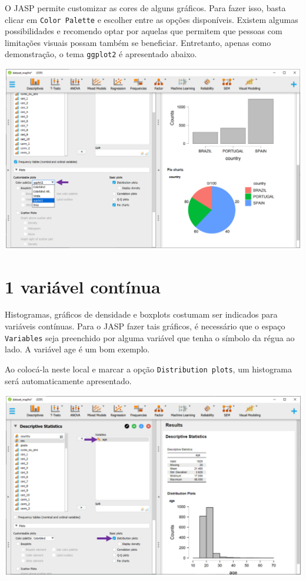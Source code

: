 \documentclass[
]{book}
\begin{document}
O JASP permite customizar as cores de alguns gráficos. Para fazer isso, basta clicar em \texttt{Color\ Palette} e escolher entre as opções disponíveis. Existem algumas possibilidades e recomendo optar por aquelas que permitem que pessoas com limitações visuais possam também se beneficiar. Entretanto, apenas como demonstração, o tema \texttt{ggplot2} é apresentado abaixo.

\includegraphics{./img/cap_desc_jasp_grafico_setor2.png}

\hypertarget{variuxe1vel-contuxednua-1}{%
\section{1 variável contínua}\label{variuxe1vel-contuxednua-1}}

Histogramas, gráficos de densidade e boxplots costumam ser indicados para variáveis contínuas. Para o JASP fazer tais gráficos, é necessário que o espaço \texttt{Variables} seja preenchido por alguma variável que tenha o símbolo da régua ao lado. A variável age é um bom exemplo.

Ao colocá-la neste local e marcar a opção \texttt{Distribution\ plots}, um histograma será automaticamente apresentado.

\includegraphics{./img/cap_desc_jasp_grafico_histograma.png}
\end{document}
